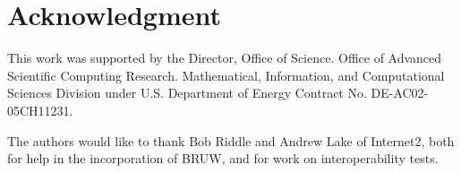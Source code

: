 \documentclass[conference]{IEEEtran}
\begin{document}
%



\section*{Acknowledgment}
This work was supported by the Director, Office of Science. Office of
Advanced Scientific Computing Research. Mathematical, Information, and
Computational Sciences Division under U.S. Department of
Energy Contract No. DE-AC02-05CH11231.

The authors would like to thank Bob Riddle and Andrew Lake of Internet2, both
for help in the incorporation of BRUW, and for work on interoperability tests.



%
%
%
\end{document}
